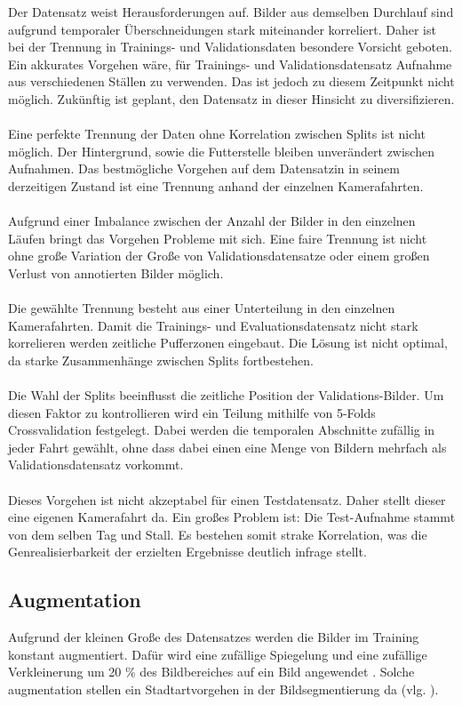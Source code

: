 \documentclass[12pt,DIV=15,BCOR=15mm,twoside,headsepline,abstract=true,listof=totoc,bibliography=totoc]{scrreprt}
\theoremstyle{remark}    %
\begin{document}
    Der Datensatz weist Herausforderungen auf. Bilder aus demselben Durchlauf sind aufgrund temporaler Überschneidungen stark miteinander korreliert.
    Daher ist bei der Trennung in Trainings- und Validationsdaten besondere Vorsicht geboten.
    Ein akkurates Vorgehen wäre, für Trainings- und Validationsdatensatz Aufnahme aus verschiedenen Ställen zu verwenden. Das ist jedoch zu diesem
    Zeitpunkt nicht möglich. Zukünftig ist geplant, den Datensatz in dieser Hinsicht zu diversifizieren.\\\\
    Eine perfekte Trennung der Daten ohne Korrelation zwischen Splits ist nicht möglich. Der Hintergrund, sowie die Futterstelle bleiben unverändert 
    zwischen Aufnahmen. Das bestmögliche Vorgehen auf dem Datensatzin in seinem derzeitigen Zustand ist eine Trennung anhand der einzelnen Kamerafahrten.\\\\
    Aufgrund einer Imbalance zwischen der Anzahl der Bilder in den einzelnen Läufen bringt das Vorgehen Probleme mit sich.
    Eine faire Trennung ist nicht ohne große Variation der Große von Validationsdatensatze oder einem großen Verlust von annotierten Bilder möglich.\\\\
    Die gewählte Trennung besteht aus einer Unterteilung in den einzelnen Kamerafahrten. Damit die Trainings- und
    Evaluationsdatensatz nicht stark korrelieren werden zeitliche Pufferzonen eingebaut. Die Lösung ist nicht optimal, da starke Zusammenhänge 
    zwischen Splits fortbestehen.\\\\
    Die Wahl der Splits beeinflusst die zeitliche Position der Validations-Bilder. Um diesen Faktor zu kontrollieren wird
    ein Teilung mithilfe von 5-Folds Crossvalidation festgelegt. Dabei werden die temporalen Abschnitte zufällig in jeder Fahrt gewählt, ohne dass dabei
    einen eine Menge von Bildern mehrfach als Validationsdatensatz vorkommt.\\\\
    Dieses Vorgehen ist nicht akzeptabel für einen Testdatensatz. Daher stellt dieser eine eigenen Kamerafahrt da. 
    Ein großes Problem ist: Die Test-Aufnahme stammt von dem selben Tag und Stall. Es bestehen somit strake Korrelation, was die Genrealisierbarkeit der 
    erzielten Ergebnisse deutlich infrage stellt.

    \subsection{Augmentation}
    Aufgrund der kleinen Große des Datensatzes werden die Bilder im Training konstant augmentiert. Dafür wird eine zufällige Spiegelung und eine zufällige
    Verkleinerung um 20 \% des Bildbereiches auf ein Bild angewendet .  
    Solche augmentation stellen ein Stadtartvorgehen in der Bildsegmentierung da (vlg. \cite{chen2017rethinkingatrousconvolutionsemantic,HaitzHuebnerUlrich2022}).
\end{document}
